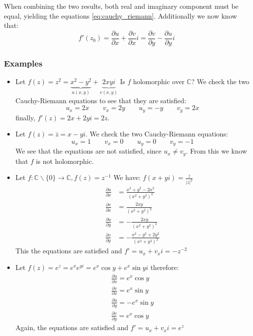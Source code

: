 When combining the two results, both real and imaginary component must be equal,
yielding the equations \eqref{eq:cauchy_riemann}. Additionally we now know that:
\begin{equation}
f'(z_0) =\frac{\partial u}{\partial x} + \frac{\partial v}{\partial x}i= \frac{\partial v}{\partial y} - \frac{\partial u}{\partial y}i
\end{equation}

\subsubsection{Examples}
\begin{itemize}
	\item 
		Let $f(z)=z^2=\underbrace{x^2-y^2}_{u(x,y)}+\underbrace{2xyi}_{v(x,y)}$ 
		Is $f$ holomorphic over $\mathbb{C}$?
		We check the two Cauchy-Riemann equations to see that they are satisfied:
		$$
		u_x = 2x\qquad v_x = 2y\qquad u_y = -y\qquad v_y = 2x 
		$$
		finally, $f'(z)=2x+2yi=2z$.
	
	\item
		Let $f(z)=\overline z = x-yi$.
		We check the two Cauchy-Riemann equations:
		$$
		u_x = 1 \qquad v_x = 0\qquad u_y=0\qquad v_y = -1
		$$
		We see that the equations are not satisfied, since $u_x \ne v_y$. From this we know that $f$ is not holomorphic.
		
	\item
		Let $f:\mathbb{C}\backslash\{0\} \to \mathbb{C}, f(z)=z^{-1}$ 
		We have: $f(x+yi) = \frac{\overline z}{|z|^2}$
		\begin{equation*}
			\begin{split}
				\frac{\partial u}{\partial x}&=\frac{x^2+y^2-2x^2}{(x^2+y^2)^2}\\
				\frac{\partial v}{\partial x}&=\frac{2xy}{(x^2+y^2)^2}\\
				\frac{\partial u}{\partial y}&=-\frac{2xy}{(x^2+y^2)^2}\\
				\frac{\partial v}{\partial y}&=-\frac{x^2-y^2+2y^2}{(x^2+y^2)^2}
			\end{split}
		\end{equation*}
		This the equations are satisfied and $f'=u_x+v_xi=-z^{-2}$
		
	\item 
		Let $f(z)=e^z=e^xe^{yi}=e^x\cos y+ e^x\sin yi$ therefore:
		\begin{equation*}
			\begin{split}
				\frac{\partial u}{\partial x} = e^x\cos y\\
				\frac{\partial v}{\partial x} = e^x\sin y\\
				\frac{\partial u}{\partial y} = -e^x\sin y\\
				\frac{\partial v}{\partial y} = e^x\cos y
			\end{split}
		\end{equation*}
		Again, the equations are satisfied and $f'=u_x+v_xi=e^z$
\end{itemize}

